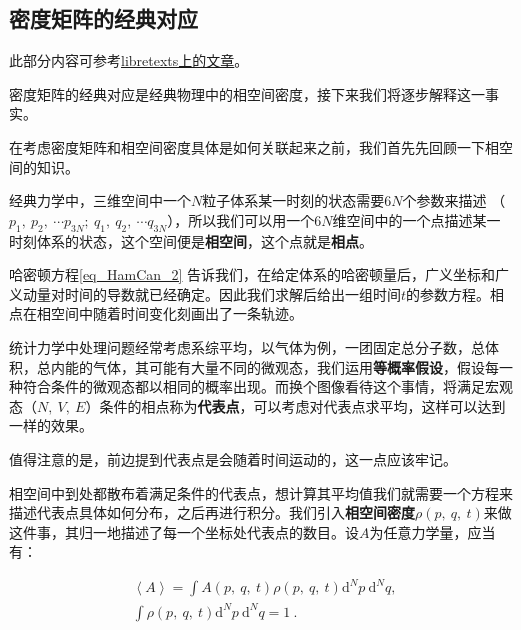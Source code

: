 \subsection{密度矩阵的经典对应}


此部分内容可参考\href{https://chem.libretexts.org/Bookshelves/Physical_and_Theoretical_Chemistry_Textbook_Maps/Supplemental_Modules_(Physical_and_Theoretical_Chemistry)/Statistical_Mechanics/Fundamentals_of_Statistical_Mechanics/09._Classical_and_quantum_dynamics_of_density_matrices}{libretexts上的文章}。

密度矩阵的经典对应是经典物理中的相空间密度，接下来我们将逐步解释这一事实。

在考虑密度矩阵和相空间密度具体是如何关联起来之前，我们首先先回顾一下相空间的知识。

经典力学中，三维空间中一个$N$粒子体系某一时刻的状态需要$6N$个参数来描述 （$p_1,~p_2,~\cdots p_{3N};~q_1,~q_2,~\cdots q_{3N}$），所以我们可以用一个$6N$维空间中的一个点描述某一时刻体系的状态，这个空间便是\textbf{相空间}，这个点就是\textbf{相点}。

哈密顿方程\autoref{eq_HamCan_2} 告诉我们，在给定体系的哈密顿量后，广义坐标和广义动量对时间的导数就已经确定。因此我们求解后给出一组时间$t$的参数方程。相点在相空间中随着时间变化刻画出了一条轨迹。

统计力学中处理问题经常考虑系综平均，以气体为例，一团固定总分子数，总体积，总内能的气体，其可能有大量不同的微观态，我们运用\textbf{等概率假设}，假设每一种符合条件的微观态都以相同的概率出现。而换个图像看待这个事情，将满足宏观态（$N,~V,~E$）条件的相点称为\textbf{代表点}，可以考虑对代表点求平均，这样可以达到一样的效果。

值得注意的是，前边提到代表点是会随着时间运动的，这一点应该牢记。

相空间中到处都散布着满足条件的代表点，想计算其平均值我们就需要一个方程来描述代表点具体如何分布，之后再进行积分。我们引入\textbf{相空间密度}$\rho\left(p,~q,~t\right)$来做这件事，其归一地描述了每一个坐标处代表点的数目。设$A$为任意力学量，应当有：

\begin{equation}\label{eq_denMat_7}
\begin{aligned}
&\left\langle A \right\rangle = \int A \left(p,~q,~t\right)\rho\left(p,~q,~t \right) \mathrm{d}^Np~\mathrm{d}^Nq ,\\
&\int \rho\left(p,~q,~t \right) \mathrm{d}^Np~\mathrm{d}^Nq = 1~.
\end{aligned}~
\end{equation}

